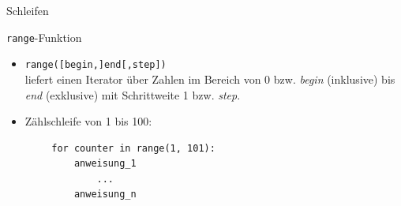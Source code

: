 \documentclass[utf8, smaller, c]{beamer}
\renewcommand{\tt}[1]{{\texttt{#1}}}
\begin{document}
\begin{frame}{Schleifen}
\begin{block}{\tt{range}-Funktion}
\begin{itemize}
			\item \tt{range([begin,]end[,step])}\\ liefert einen Iterator über Zahlen im Bereich von 0 bzw. \textit{begin} (inklusive) bis \textit{end} (exklusive) mit Schrittweite 1 bzw. \textit{step}.
			\item Zählschleife von 1 bis 100:
		\end{itemize}
		\begin{lstlisting}
		for counter in range(1, 101):
			anweisung_1
				...
			anweisung_n
		\end{lstlisting}
	\end{block}
\end{frame}

\end{document}
